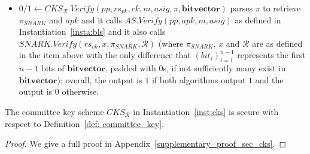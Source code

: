 \begin{construction}
\begin{itemize}
\item $0/1 \leftarrow \mathit{CKS_{\mathcal{R}}.Verify}(\mathit{pp}, \mathit{rs}_{\mathit{vk}}, \mathit{ck}, m, \mathit{asig}, \pi, \mathbf{bitvector})$ 
parses $\pi$ to retrieve $\pi_{\mathit{SNARK}}$ and $\mathit{apk}$ and it calls $\mathit{AS.Verify(\mathit{pp}, \mathit{apk}, m, \mathit{asig})}$ 
as defined in Instantiation~\ref{insta:bls} and it also calls \\ $\mathit{SNARK.Verify}(\mathit{rs_{vk}}, x, \pi_{\mathit{SNARK}}, \mathcal{R})$ 
(where $\pi_{\mathit{SNARK}}$, $x$ and $\mathcal{R}$ are as defined in the item above with the only difference that $(\mathit{bit_i})_{i=1}^{n-1}$ 
represents the first $n-1$ bits of $\mathbf{bitvector}$, padded with $0$s, if not sufficiently many exist in $\mathbf{bitvector}$); 
overall, the output is $1$ if both algorithms output $1$ and the output is $0$ otherwise.
\end{itemize}
\end{construction}
\vspace{-0.07in}
\begin{theorem} 
The committee key scheme $\mathit{CKS}_{\mathcal{R}}$ in Instantiation~\ref{inst:cks} is secure with respect to Definition~\ref{def: committee_key}.
\end{theorem}
\vspace{-0.08in}
\begin{proof} We give a full proof in Appendix~\ref{supplementary_proof_sec_cks}. 
\end{proof}
